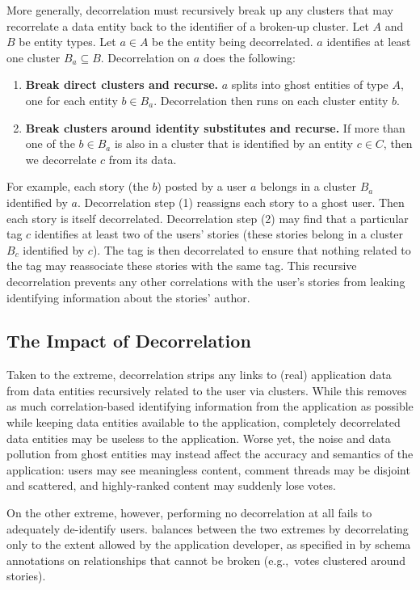 More generally, decorrelation must recursively break up any clusters that may recorrelate a data
entity back to the identifier of a broken-up cluster. Let $A$ and $B$ be entity types. Let $a \in A$ be the
entity being decorrelated. $a$ identifies at least one cluster $B_a \subseteq B$.
Decorrelation on $a$ does the following: 
\begin{enumerate}
    \item \textbf{Break direct clusters and recurse.} $a$ splits into ghost entities of type $A$, one for each entity
        $b\in B_a$. Decorrelation then runs on each cluster entity $b$.

    \item \textbf{Break clusters around identity substitutes and recurse.} 
        If more than one of the $b \in B_a$ is also in a cluster that is identified by an entity $c
        \in C$, then we decorrelate $c$ from its data. 
        
\end{enumerate}
For example, each story (the $b$) posted by a user $a$ belongs in a cluster $B_a$ identified by $a$.
Decorrelation step (1) reassigns each story to a ghost user. Then each story is itself decorrelated.
Decorrelation step (2) may find that a particular tag $c$ identifies at least two of the users'
stories (these stories belong in a cluster $B_c$ identified by $c$). The tag is then decorrelated to
ensure that nothing related to the tag may reassociate these stories with the same tag.  This
recursive decorrelation prevents any other correlations with the user's stories from leaking
identifying information about the stories' author.

\subsection{The Impact of Decorrelation}
Taken to the extreme, decorrelation strips any links to (real) application data from data entities
recursively related to the user via clusters. While this removes as much correlation-based
identifying information from the application as possible while keeping data entities available to
the application, completely decorrelated data entities may be useless to the application. Worse yet,
the noise and data pollution from ghost entities may instead affect the accuracy and semantics of
the application: users may see meaningless content, comment threads may be disjoint and scattered,
and highly-ranked content may suddenly lose votes.

On the other extreme, however, performing no decorrelation at all fails to adequately de-identify
users. \sys{} balances between the two extremes by decorrelating only to the extent allowed by the
application developer, as specified in by schema annotations on relationships that cannot be broken
(e.g.,\ votes clustered around stories). 

